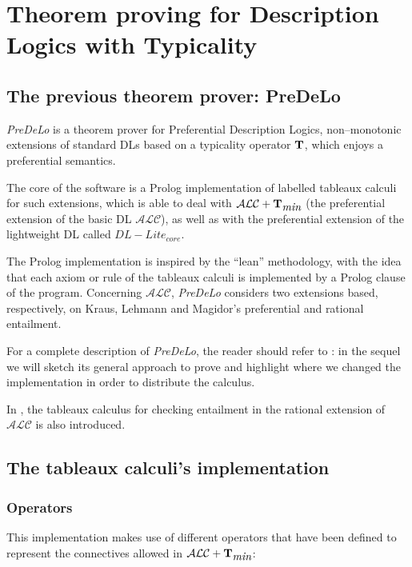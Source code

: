 \documentclass[a4paper, 11pt, oneside]{duthesis}
\newcommand{\tip}{{\bf T}}
\newcommand{\alc}{\mathcal{ALC}}
\newcommand{\alctmin}{\mathcal{ALC}+\tip_{\mbox{\em min}}}
\begin{document}
\chapter{Theorem proving for Description Logics with Typicality}\label{chap_theorem_proving}

\section{The previous theorem prover: PreDeLo}\label{predelo}
\emph{PreDeLo} is a theorem prover for Preferential Description Logics, non--monotonic extensions of standard DLs based on a typicality operator $\tip$, which enjoys a preferential semantics.

The core of the software is a Prolog implementation of labelled tableaux calculi for such extensions, which is able to deal with $\alctmin$ (the preferential extension of the basic DL $\alc$), as well as with the preferential extension of the lightweight DL called $DL-Lite_{core}$.

The Prolog implementation is inspired by the ``lean'' methodology, with the idea that each axiom or rule of the tableaux calculi is implemented by a Prolog clause of the program.
Concerning $\alc$, \emph{PreDeLo} considers two extensions based, respectively, on Kraus, Lehmann and Magidor’s preferential and rational entailment.

For a complete description of \emph{PreDeLo}, the reader should refer to \cite{conf/aiia/GiordanoGJOP13}: in the sequel we will sketch its general approach to prove and highlight where we changed the implementation in order to distribute the calculus.

In \cite{conf/aiia/GiordanoGJOP13}, the tableaux calculus for checking entailment in the rational extension of $\alc$ is also introduced.

\section{The tableaux calculi's implementation}

\subsection{Operators}

This implementation makes use of different operators that have been defined to represent the connectives allowed in $\alctmin$:
\end{document}
